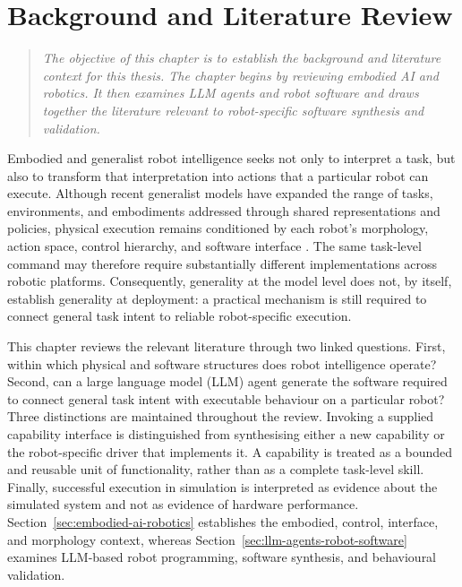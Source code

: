 \chapter[Background and Literature Review]{Background and Literature Review}
\label{chapter:background}

\begin{quote}\itshape
The objective of this chapter is to establish the background and literature
context for this thesis. The chapter begins by reviewing embodied AI and
robotics. It then examines LLM agents and robot software and draws together the
literature relevant to robot-specific software synthesis and validation.
\end{quote}

Embodied and generalist robot intelligence seeks not only to interpret a task,
but also to transform that interpretation into actions that a particular robot
can execute. Although recent generalist models have expanded the range of
tasks, environments, and embodiments addressed through shared representations
and policies, physical execution remains conditioned by each robot's
morphology, action space, control hierarchy, and software interface
\citep{brooks1991intelligence,brohan2022rt1,openxembodiment2024}. The same
task-level command may therefore require substantially different
implementations across robotic platforms. Consequently, generality at the
model level does not, by itself, establish generality at deployment: a
practical mechanism is still required to connect general task intent to
reliable robot-specific execution.

This chapter reviews the relevant literature through two linked questions.
First, within which physical and software structures does robot intelligence
operate? Second, can a large language model (LLM) agent generate the software
required to connect general task intent with executable behaviour on a
particular robot? Three distinctions are maintained throughout the review.
Invoking a supplied capability interface is distinguished from synthesising
either a new capability or the robot-specific driver that implements it. A
capability is treated as a bounded and reusable unit of functionality, rather
than as a complete task-level skill. Finally, successful execution in
simulation is interpreted as evidence about the simulated system and not as
evidence of hardware performance. Section~\ref{sec:embodied-ai-robotics} establishes the embodied,
control, interface, and morphology context, whereas Section~\ref{sec:llm-agents-robot-software} examines
LLM-based robot programming, software synthesis, and behavioural validation.


